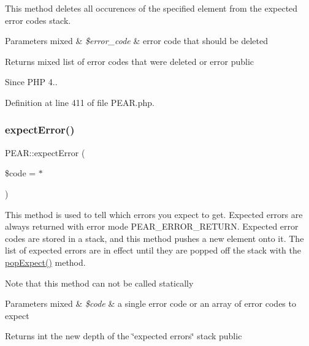 This method deletes all occurences of the specified element from the expected error codes stack.


\begin{DoxyParams}[1]{Parameters}
mixed & {\em \$error\+\_\+code} & error code that should be deleted \\
\hline
\end{DoxyParams}
\begin{DoxyReturn}{Returns}
mixed list of error codes that were deleted or error  public 
\end{DoxyReturn}
\begin{DoxySince}{Since}
P\+HP 4.. 
\end{DoxySince}


Definition at line 411 of file P\+E\+A\+R.\+php.

\mbox{\label{classPEAR_a99f53f3623ab2fdbb046d85711e36a65}} 
\subsubsection{\texorpdfstring{expect\+Error()}{expectError()}}
{\footnotesize\ttfamily P\+E\+A\+R\+::expect\+Error (\begin{DoxyParamCaption}\item[{}]{\$code = {\ttfamily \textquotesingle{}$\ast$\textquotesingle{}} }\end{DoxyParamCaption})}

This method is used to tell which errors you expect to get. Expected errors are always returned with error mode P\+E\+A\+R\+\_\+\+E\+R\+R\+O\+R\+\_\+\+R\+E\+T\+U\+RN. Expected error codes are stored in a stack, and this method pushes a new element onto it. The list of expected errors are in effect until they are popped off the stack with the \hyperlink{classPEAR_a3ea2df43e39214a29f77f8773a5afcc4}{pop\+Expect()} method.

Note that this method can not be called statically


\begin{DoxyParams}[1]{Parameters}
mixed & {\em \$code} & a single error code or an array of error codes to expect\\
\hline
\end{DoxyParams}
\begin{DoxyReturn}{Returns}
int the new depth of the \char`\"{}expected errors\char`\"{} stack  public 
\end{DoxyReturn}



